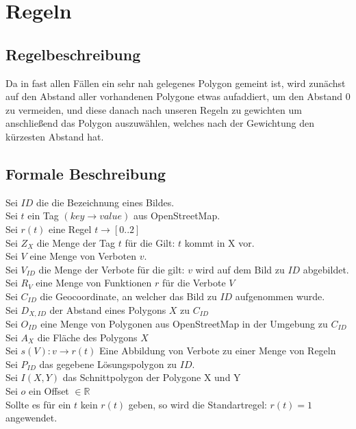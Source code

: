 \section{Regeln}

\subsection{Regelbeschreibung}
Da in fast allen Fällen ein sehr nah gelegenes Polygon gemeint ist, wird zunächst auf den Abstand aller vorhandenen Polygone etwas aufaddiert,
um den Abstand 0 zu vermeiden, und diese danach nach unseren Regeln zu gewichten um anschließend das Polygon auszuwählen,
welches nach der Gewichtung den kürzesten Abstand hat.



\subsection{Formale Beschreibung}
Sei $ID$ die die Bezeichnung eines Bildes.\\
Sei $t$ ein Tag $(key \to value)$ aus OpenStreetMap.\\
Sei $r(t)$ eine Regel $t \to [0..2]$ \\
Sei $Z_{X}$ die Menge der Tag $t$ für die Gilt: $t$ kommt in X vor. \\
Sei $V$ eine Menge von Verboten $v$.\\
Sei $V_{ID}$ die Menge der Verbote für die gilt: $v$ wird auf dem Bild zu $ID$ abgebildet.\\
Sei $R_V$ eine Menge von Funktionen $r$ für die Verbote $V$\\
Sei $C_{ID}$ die Geocoordinate, an welcher das Bild zu $ID$ aufgenommen wurde. \\
Sei $D_{X,ID}$ der Abstand eines Polygons $X$ zu $C_{ID}$ \\
Sei $O_{ID}$ eine Menge von Polygonen aus OpenStreetMap in der Umgebung zu $C_{ID}$\\
Sei $A_{X}$ die Fläche des Polygons $X$\\
Sei $s(V) : v \to r(t)$  Eine Abbildung von Verbote zu einer Menge von Regeln\\
Sei $P_{ID}$ das gegebene Lösungspolygon zu $ID$.\\
Sei $I(X,Y)$ das Schnittpolygon der Polygone X und Y\\
Sei $o$ ein Offset $\in \mathbb{R}$
\\
Sollte es für ein $t$ kein $r(t)$ geben, so wird die Standartregel:
$r(t) = 1$ angewendet.

